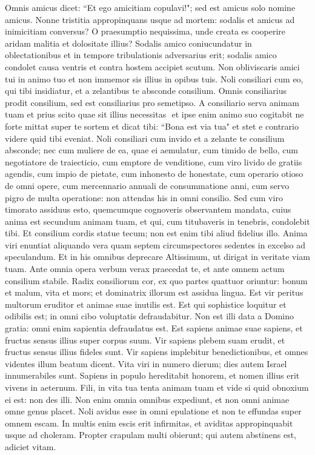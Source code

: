 \begin{biblechapter}  
\verse Omnis amicus dicet: “Et ego amicitiam copulavi!"; sed est amicus solo nomine amicus. Nonne tristitia appropinquans usque ad mortem: 
\verse sodalis et amicus ad inimicitiam conversus? 
\verse O praesumptio nequissima, unde creata es cooperire aridam malitia et dolositate illius? 
\verse Sodalis amico coniucundatur in oblectationibus et in tempore tribulationis adversarius erit; 
\verse sodalis amico condolet causa ventris et contra hostem accipiet scutum. 
\verse Non obliviscaris amici tui in animo tuo et non immemor sis illius in opibus tuis. 
\verse Noli consiliari cum eo, qui tibi insidiatur, et a zelantibus te absconde consilium. 
\verse Omnis consiliarius prodit consilium, sed est consiliarius pro semetipso. 
\verse A consiliario serva animam tuam et prius scito quae sit illius necessitas ­ et ipse enim animo suo cogitabit ­ 
\verse ne forte mittat super te sortem et dicat tibi: 
\verse “Bona est via tua" et stet e contrario videre quid tibi eveniat. 
\verse Noli consiliari cum invido et a zelante te consilium absconde; nec cum muliere de ea, quae ei aemulatur, cum timido de bello, cum negotiatore de traiecticio, cum emptore de venditione, cum viro livido de gratiis agendis, 
\verse cum impio de pietate, cum inhonesto de honestate, cum operario otioso de omni opere, 
\verse cum mercennario annuali de consummatione anni, cum servo pigro de multa operatione: non attendas his in omni consilio. 
\verse Sed cum viro timorato assiduus esto, quemcumque cognoveris observantem mandata, 
\verse cuius anima est secundum animam tuam, et qui, cum titubaveris in tenebris, condolebit tibi. 
\verse Et consilium cordis statue tecum; non est enim tibi aliud fidelius illo. 
\verse Anima viri enuntiat aliquando vera quam septem circumspectores sedentes in excelso ad speculandum. 
\verse Et in his omnibus deprecare Altissimum, ut dirigat in veritate viam tuam. 
\verse Ante omnia opera verbum verax praecedat te, et ante omnem actum consilium stabile. 
\verse Radix consiliorum cor, ex quo partes quattuor oriuntur: bonum et malum, vita et mors; et dominatrix illorum est assidua lingua. 
\verse Est vir peritus multorum eruditor et animae suae inutilis est. 
\verse Est qui sophistice loquitur et odibilis est; in omni cibo voluptatis defraudabitur. 
\verse Non est illi data a Domino gratia: omni enim sapientia defraudatus est. 
\verse Est sapiens animae suae sapiens, et fructus sensus illius super corpus suum. 
\verse Vir sapiens plebem suam erudit, et fructus sensus illius fideles sunt. 
\verse Vir sapiens implebitur benedictionibus, et omnes videntes illum beatum dicent. 
\verse Vita viri in numero dierum; dies autem Israel innumerabiles sunt. 
\verse Sapiens in populo hereditabit honorem, et nomen illius erit vivens in aeternum. 
\verse Fili, in vita tua tenta animam tuam et vide si quid obnoxium ei est: non des illi. 
\verse Non enim omnia omnibus expediunt, et non omni animae omne genus placet. 
\verse Noli avidus esse in omni epulatione et non te effundas super omnem escam. 
\verse In multis enim escis erit infirmitas, et aviditas appropinquabit usque ad choleram. 
\verse Propter crapulam multi obierunt; qui autem abstinens est, adiciet vitam. 
\end{biblechapter}

